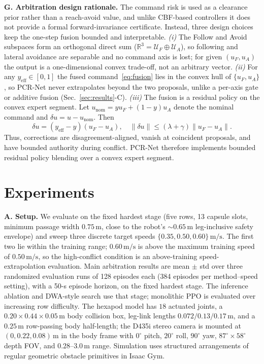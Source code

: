 \documentclass[letterpaper, 10 pt, conference]{ieeeconf}
\newcommand{\uF}{u_{F}}
\newcommand{\uA}{u_{A}}
\newcommand{\yeff}{y_{\mathrm{eff}}}
\newcommand{\msec}{\,\mathrm{m/s}}
\begin{document}
\textbf{G. Arbitration design rationale.}
The command risk is used as a clearance prior rather than a reach-avoid
value, and unlike CBF-based controllers it does not provide a formal
forward-invariance certificate. Instead, three design choices keep the
one-step fusion bounded and interpretable. \emph{(i)} The Follow and Avoid
subspaces form an orthogonal direct sum
($\mathbb{R}^3=\mathcal{U}_F\oplus\mathcal{U}_A$), so following and lateral
avoidance are separable and no command axis is lost; for given $(\uF,\uA)$
the output is a one-dimensional convex trade-off, not an arbitrary vector.
\emph{(ii)} For any $\yeff\in[0,1]$ the fused command~\eqref{eq:fusion} lies
in the convex hull of $\{\uF,\uA\}$, so PCR-Net never extrapolates beyond
the two proposals, unlike a per-axis gate or additive fusion
(Sec.~\ref{sec:results}-C). \emph{(iii)} The fusion is a residual policy on
the convex expert segment. Let
$u_{\mathrm{nom}}=y\uF+(1-y)\uA$ denote the nominal command and
$\delta u=u-u_{\mathrm{nom}}$. Then
\begin{equation}
\delta u=(\yeff-y)(\uF-\uA),\quad
\|\delta u\|\le(\lambda+\gamma)\|\uF-\uA\|.
\label{eq:residual_bound}
\end{equation}
Thus, corrections are disagreement-aligned, vanish at coincident proposals,
and have bounded authority during conflict. PCR-Net therefore implements
bounded residual policy blending over a convex expert segment.

\section{Experiments}
\textbf{A. Setup.}
We evaluate on the fixed hardest stage (five rows, 13 capsule slots,
minimum passage width $0.75\,\mathrm{m}$, close to the robot's
$\sim0.65\,\mathrm{m}$ leg-inclusive safety envelope) and sweep three discrete target
speeds $\{0.35,0.50,0.60\}\msec$. The first two lie within the training
range; $0.60\msec$ is above the maximum training speed of $0.50\msec$, so
the high-conflict condition is an above-training speed-extrapolation
evaluation. Main arbitration results are mean $\pm$ std over three randomized
evaluation runs of 128 episodes each (384 episodes per method--speed
setting), with a 50-s episode horizon, on the fixed hardest stage. The inference ablation and DWA-style search
use that stage; monolithic PPO is evaluated over increasing row difficulty.
The hexapod model has $18$ actuated joints, a
$0.20\times0.44\times0.05\,\mathrm{m}$ body collision box, leg-link lengths
$0.072/0.13/0.17\,\mathrm{m}$, and a $0.25\,\mathrm{m}$ row-passing body
half-length; the D435i stereo camera is mounted at $(0,0.22,0.08)\,\mathrm{m}$ in the body
frame with $0^\circ$ pitch, $20^\circ$ roll, $90^\circ$ yaw,
$87^\circ\times58^\circ$ depth FOV, and $0.28$--$3.0\,\mathrm{m}$ range.
Simulation uses structured arrangements of regular geometric obstacle
primitives in Isaac Gym.
\end{document}
